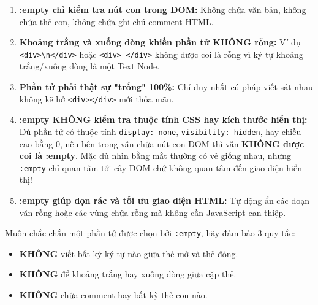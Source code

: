 \documentclass[11pt,oneside]{book}
\newcommand{\codeinline}[1]{\textcolor{accentOrange}{\texttt{#1}}}
\begin{document}
\begin{warnBox}
\begin{enumerate}[leftmargin=1.5em, itemsep=4pt, parsep=0pt]
    \item \textbf{:empty chỉ kiểm tra nút con trong DOM:} Không chứa văn bản, không chứa thẻ con, không chứa ghi chú comment HTML.
    \item \textbf{Khoảng trắng và xuống dòng khiến phần tử KHÔNG rỗng:} Ví dụ \codeinline{<div>\textbackslash{}n</div>} hoặc \codeinline{<div>   </div>} không được coi là rỗng vì ký tự khoảng trắng/xuống dòng là một Text Node.
    \item \textbf{Phần tử phải thật sự "trống" 100\%:} Chỉ duy nhất cú pháp viết sát nhau không kẽ hở \codeinline{<div></div>} mới thỏa mãn.
    \item \textbf{:empty KHÔNG kiểm tra thuộc tính CSS hay kích thước hiển thị:} Dù phần tử có thuộc tính \codeinline{display: none}, \codeinline{visibility: hidden}, hay chiều cao bằng 0, nếu bên trong vẫn chứa nút con DOM thì vẫn \textbf{KHÔNG được coi là :empty}. Mặc dù nhìn bằng mắt thường có vẻ giống nhau, nhưng \codeinline{:empty} chỉ quan tâm tới cây DOM chứ không quan tâm đến giao diện hiển thị!
    \item \textbf{:empty giúp dọn rác và tối ưu giao diện HTML:} Tự động ẩn các đoạn văn rỗng hoặc các vùng chứa rỗng mà không cần JavaScript can thiệp.
\end{enumerate}
\end{warnBox}

\begin{tipBox}
Muốn chắc chắn một phần tử được chọn bởi \codeinline{:empty}, hãy đảm bảo 3 quy tắc:
\begin{itemize}[leftmargin=1.5em, itemsep=2pt, parsep=0pt]
    \item \textbf{KHÔNG} viết bất kỳ ký tự nào giữa thẻ mở và thẻ đóng.
    \item \textbf{KHÔNG} để khoảng trắng hay xuống dòng giữa cặp thẻ.
    \item \textbf{KHÔNG} chứa comment hay bất kỳ thẻ con nào.
\end{itemize}
\end{tipBox}
\end{document}
